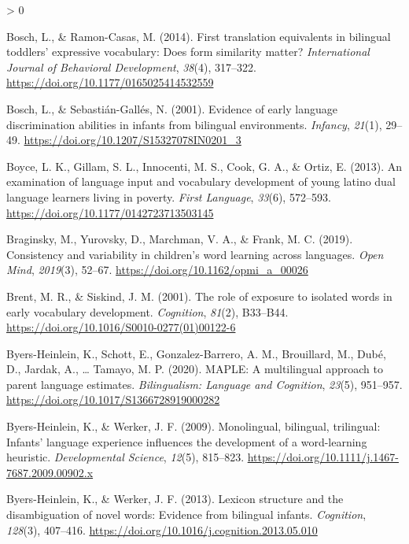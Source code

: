 \documentclass[
  english,
  ,man,floatsintext]{apa6}
\newlength{\cslhangindent}
\newenvironment{CSLReferences}[2] %
 {%
  \setlength{\parindent}{0pt}
  \ifodd #1 \everypar{\setlength{\hangindent}{\cslhangindent}}\ignorespaces\fi
  \ifnum #2 > 0
  \setlength{\parskip}{#2\baselineskip}
  \fi
 }%
 {}
\begin{document}
\begin{CSLReferences}{1}{0}
\leavevmode\hypertarget{ref-Bosch_Ramon-Casas_2014}{}%
Bosch, L., \& Ramon-Casas, M. (2014). First translation equivalents in bilingual toddlers' expressive vocabulary: Does form similarity matter? \emph{International Journal of Behavioral Development}, \emph{38}(4), 317--322. \url{https://doi.org/10.1177/0165025414532559}

\leavevmode\hypertarget{ref-Bosch_Sebastian-Galles_2001}{}%
Bosch, L., \& Sebastián-Gallés, N. (2001). Evidence of early language discrimination abilities in infants from bilingual environments. \emph{Infancy}, \emph{21}(1), 29--49. \url{https://doi.org/10.1207/S15327078IN0201_3}

\leavevmode\hypertarget{ref-Boyce_etal_2013}{}%
Boyce, L. K., Gillam, S. L., Innocenti, M. S., Cook, G. A., \& Ortiz, E. (2013). An examination of language input and vocabulary development of young latino dual language learners living in poverty. \emph{First Language}, \emph{33}(6), 572--593. \url{https://doi.org/10.1177/0142723713503145}

\leavevmode\hypertarget{ref-Braginsky_etal_2019}{}%
Braginsky, M., Yurovsky, D., Marchman, V. A., \& Frank, M. C. (2019). Consistency and variability in children's word learning across languages. \emph{Open Mind}, \emph{2019}(3), 52--67. \url{https://doi.org/10.1162/opmi_a_00026}

\leavevmode\hypertarget{ref-Brent_Siskind_2001}{}%
Brent, M. R., \& Siskind, J. M. (2001). The role of exposure to isolated words in early vocabulary development. \emph{Cognition}, \emph{81}(2), B33--B44. \url{https://doi.org/10.1016/S0010-0277(01)00122-6}

\leavevmode\hypertarget{ref-Byers-Heinlein_etal_2020}{}%
Byers-Heinlein, K., Schott, E., Gonzalez-Barrero, A. M., Brouillard, M., Dubé, D., Jardak, A., \ldots{} Tamayo, M. P. (2020). MAPLE: A multilingual approach to parent language estimates. \emph{Bilingualism: Language and Cognition}, \emph{23}(5), 951--957. \url{https://doi.org/10.1017/S1366728919000282}

\leavevmode\hypertarget{ref-Byers-Heinlein_Werker_2009}{}%
Byers-Heinlein, K., \& Werker, J. F. (2009). Monolingual, bilingual, trilingual: Infants' language experience influences the development of a word-learning heuristic. \emph{Developmental Science}, \emph{12}(5), 815--823. \url{https://doi.org/10.1111/j.1467-7687.2009.00902.x}

\leavevmode\hypertarget{ref-Byers-Heinlein_Werker_2013}{}%
Byers-Heinlein, K., \& Werker, J. F. (2013). Lexicon structure and the disambiguation of novel words: Evidence from bilingual infants. \emph{Cognition}, \emph{128}(3), 407--416. \url{https://doi.org/10.1016/j.cognition.2013.05.010}


\end{CSLReferences}
\end{document}

